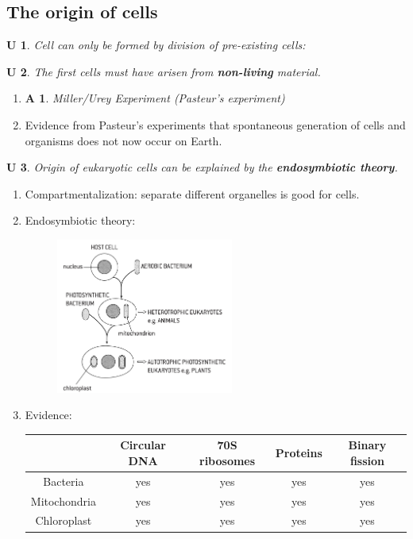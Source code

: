 \documentclass[12pt, a4paper]{article}
\newtheorem{und}{U}[subsection]
\newtheorem{app}{A}[subsection]
\begin{document}
\subsection{The origin of cells}
\begin{und}
    Cell can only be formed by division of pre-existing cells: {\color{blue}{cell division and binary fission. }}
\end{und}
\begin{und}
    The first cells must have arisen from \textbf{non-living} material.
\end{und}
\begin{enumerate}
    \item \begin{app} Miller/Urey Experiment (Pasteur's experiment) \end{app}
    \item Evidence from Pasteur's experiments that spontaneous generation of cells and organisms does not now occur on Earth. 
\end{enumerate}
\begin{und}
    Origin of eukaryotic cells can be explained by the \textbf{endosymbiotic theory}. 
\end{und}
\begin{enumerate}
    \item Compartmentalization: separate different organelles is good for cells.
    \item Endosymbiotic theory: 
    \begin{figure}[H]
        \center
        \includegraphics[width=0.55\textwidth]{Fig1.17.png}
    \end{figure}
    \item Evidence: 
    \begin{center}
        \begin{tabular}{c|c|c|c|c}
            \ &Circular DNA&70S ribosomes&Proteins&Binary fission\\
            \hline
            Bacteria&yes&yes&yes&yes\\
            Mitochondria&yes&yes&yes&yes\\
            Chloroplast&yes&yes&yes&yes\\
        \end{tabular}
    \end{center}
\end{enumerate}
\end{document}
